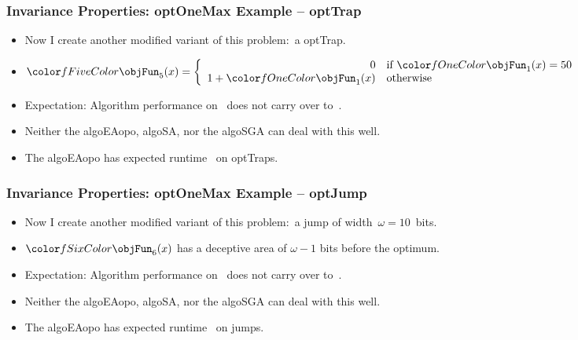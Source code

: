 \documentclass[aspectratio=169,mathserif,notheorems]{beamer}%
\begin{document}
\begin{frame}%
\frametitle{Invariance Properties: \gls{optOneMax} Example -- \gls{optTrap}}%
\parbox{0.415\paperwidth}{%
\begin{itemize}%
\item Now I create another modified variant of this problem:~a \gls{optTrap}\cite{DJW2002OTAOTOPOEA,NB2003AAOTBOSEAOTF}.%
\item<2-> \mbox{$\fn{5}(x)=\left\{\begin{array}{rl}0&\textnormal{if~}\fn{1}(x)=50\\1+\fn{1}(x)&\textnormal{otherwise}\end{array}\right.$\hspace{-5em}}%
\item<4-> Expectation: Algorithm performance on~ does not carry over to~.
\item<5-> Neither the \gls{algoEAopo}, \gls{algoSA}, nor the \gls{algoSGA} can deal with this well.%
\item<6-> The \gls{algoEAopo} has expected runtime~\bigThetab{\scale^{\scale}} on \glspl{optTrap}\cite{DJW2002OTAOTOPOEA}.%
\end{itemize}%
}%
%
%
%
\end{frame}%
%
\begin{frame}%
\frametitle{Invariance Properties: \gls{optOneMax} Example -- \gls{optJump}}%
\parbox{0.415\paperwidth}{%
\begin{itemize}%
\item Now I create another modified variant of this problem:~a jump of width~$\omega=10$~bits.%
\item<2-> $\fn{6}(x)$ has a deceptive area of $\omega-1$ bits before the optimum.%
\item<3-> Expectation: Algorithm performance on~ does not carry over to~.%
\item<4-> Neither the \gls{algoEAopo}, \gls{algoSA}, nor the \gls{algoSGA} can deal with this well.%
\item<5-> The \gls{algoEAopo} has expected runtime~\bigThetab{\scale^{\omega} + \scale\ln{\scale}} on jumps\cite{DJW2002OTAOTOPOEA}.%
\end{itemize}%
}%
%
\end{frame}%
\end{document}
